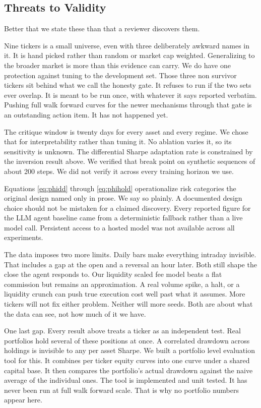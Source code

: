 \documentclass[conference]{IEEEtran}
\begin{document}
\subsection{Threats to Validity}
\label{sec:limitations}

Better that we state these than that a reviewer discovers them.

Nine tickers is a small universe, even with three deliberately awkward names in it. It is hand picked rather than random or market cap weighted. Generalizing to the broader market is more than this evidence can carry. We do have one protection against tuning to the development set. Those three non survivor tickers sit behind what we call the honesty gate. It refuses to run if the two sets ever overlap. It is meant to be run once, with whatever it says reported verbatim. Pushing full walk forward curves for the newer mechanisms through that gate is an outstanding action item. It has not happened yet.

The critique window is twenty days for every asset and every regime. We chose that for interpretability rather than tuning it. No ablation varies it, so its sensitivity is unknown. The differential Sharpe adaptation rate is constrained by the inversion result above. We verified that break point on synthetic sequences of about 200 steps. We did not verify it across every training horizon we use.

Equations \ref{eq:phidd} through \ref{eq:phihold} operationalize risk categories the original design named only in prose. We say so plainly. A documented design choice should not be mistaken for a claimed discovery. Every reported figure for the LLM agent baseline came from a deterministic fallback rather than a live model call. Persistent access to a hosted model was not available across all experiments.

The data imposes two more limits. Daily bars make everything intraday invisible. That includes a gap at the open and a reversal an hour later. Both still shape the close the agent responds to. Our liquidity scaled fee model beats a flat commission but remains an approximation. A real volume spike, a halt, or a liquidity crunch can push true execution cost well past what it assumes. More tickers will not fix either problem. Neither will more seeds. Both are about what the data can see, not how much of it we have.

One last gap. Every result above treats a ticker as an independent test. Real portfolios hold several of these positions at once. A correlated drawdown across holdings is invisible to any per asset Sharpe. We built a portfolio level evaluation tool for this. It combines per ticker equity curves into one curve under a shared capital base. It then compares the portfolio's actual drawdown against the naive average of the individual ones. The tool is implemented and unit tested. It has never been run at full walk forward scale. That is why no portfolio numbers appear here.
\end{document}
